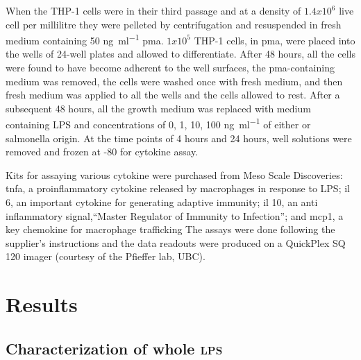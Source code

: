 When the THP-1 cells were in their third passage and at a density of $1.4x10^{6}$ live cell per millilitre they were pelleted by centrifugation and resuspended in fresh medium containing 50 \si{\nano\gram\per\milli\litre} \ac{pma}. $1x10^{5}$ THP-1 cells, in \ac{pma}, were placed into the wells of 24-well plates and allowed to differentiate. After 48 hours, all the cells were found to have become adherent to the well surfaces, the \ac{pma}-containing medium was removed, the cells were washed once with fresh medium, and then fresh medium was applied to all the wells and the cells allowed to rest. After a subsequent 48 hours, all the growth medium was replaced with medium containing \ac{LPS} and concentrations of 0, 1, 10, 100 \si{\nano\gram\per\milli\litre} of either \caulobacter{} or \ac{salmonella} origin. At the time points of 4 hours and 24 hours, well solutions were removed and frozen at -80\cel{} for cytokine assay.
      
Kits for assaying various cytokine were purchased from Meso Scale Discoveries: \ac{tnfa}, a proinflammatory cytokine released by macrophages in response to \ac{LPS}; \ac{il} 6, an important cytokine for generating adaptive immunity; \ac{il} 10, an anti inflammatory signal,``Master Regulator of Immunity to Infection''; and \ac{mcp1}, a key chemokine for macrophage trafficking The assays were done following the supplier's instructions and the data readouts were produced on a QuickPlex SQ 120 imager (courtesy of the Pfieffer lab, UBC).
    
\section{Results} %
\label{sec:lps_results}
\subsection{Characterization of whole \textsc{lps}} %
\label{sub:characterisation_of_whole_lps}

